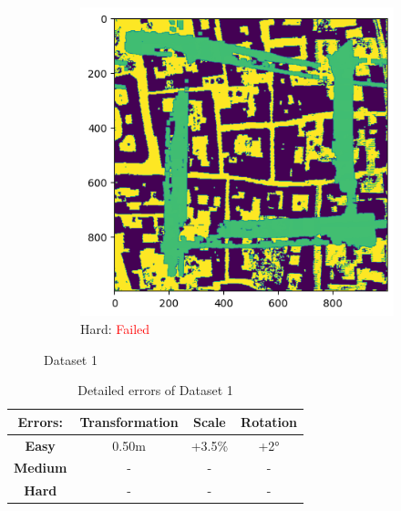 \documentclass[11pt]{article}
\begin{document}
\begin{figure}[p]
        \vspace{1em}

        \begin{subfigure}{0.45\textwidth}
            \centering
            \includegraphics[width=\linewidth]{images/full/hard/4_3_3_hard}
            \caption{Hard: \textcolor{red}{Failed}}
            \label{fig:4_3_3_hard}
        \end{subfigure}
        \hfill

        \caption{Dataset 1}
        \label{fig:res_4_3_3}
    \end{figure}

    \begin{table}[p]
        \centering
        \begin{tabular}{|c|c|c|c|}
          \hline
          \textbf{Errors:} & \textbf{Transformation} & \textbf{Scale} & \textbf{Rotation} \\
          \hline
          \textbf{Easy} & 0.50m & +3.5\% & +2° \\
          \hline
          \textbf{Medium} & - & - & - \\
          \hline
          \textbf{Hard} & - & - & - \\
          \hline
        \end{tabular}
        \caption{Detailed errors of Dataset 1}
        \label{tab:simpletable}
    \end{table}
\end{document}
